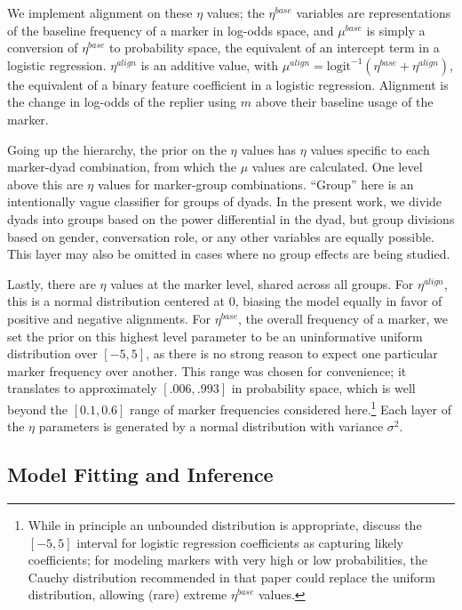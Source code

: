 \documentclass{acm_proc_article-sp}
\begin{document}
We implement alignment on these $\eta$ values; the $\eta^{base}$ variables are representations of the baseline frequency of a marker in log-odds space, and $\mu^{base}$ is simply a conversion of $\eta^{base}$ to probability space, the equivalent of an intercept term in a logistic regression. $\eta^{align}$ is an additive value, with $\mu^{align} = \textrm{logit}^{-1}(\eta^{base}+\eta^{align})$, the equivalent of a binary feature coefficient in a logistic regression.  Alignment is the change in log-odds of the replier using $m$ above their baseline usage of the marker. %

Going up the hierarchy, the prior on the $\eta$ values has $\eta$ values specific to each marker-dyad combination, from which the $\mu$ values are calculated. One level above this are $\eta$ values for marker-group combinations. ``Group'' here is an intentionally vague classifier for groups of dyads.  In the present work, we divide dyads into groups based on the power differential in the dyad, but group divisions based on gender, conversation role, or any other variables are equally possible. This layer may also be omitted in cases where no group effects are being studied.

Lastly, there are $\eta$ values at the marker level, shared across all groups.  For $\eta^{align}$, this is a normal distribution centered at 0, biasing the model equally in favor of positive and negative alignments. For $\eta^{base}$, the overall frequency of a marker, we set the prior on this highest level parameter to be an uninformative uniform distribution over $[-5,5]$, as there is no strong reason to expect one particular marker frequency over another.  This range was chosen for convenience; it translates to approximately $[.006, .993]$ in probability space, which is well beyond the $[0.1,0.6]$ range of marker frequencies considered here.\footnote{While in principle an unbounded distribution is appropriate, \cite{GelmanEtAl2008} discuss the $[-5,5]$ interval for logistic regression coefficients as capturing likely coefficients; for modeling markers with very high or low probabilities, the Cauchy distribution recommended in that paper could replace the uniform distribution, allowing (rare) extreme $\eta^{base}$ values.}  Each layer of the $\eta$ parameters is generated by a normal distribution with variance $\sigma^2$.

\subsection{Model Fitting and Inference}
\end{document}

